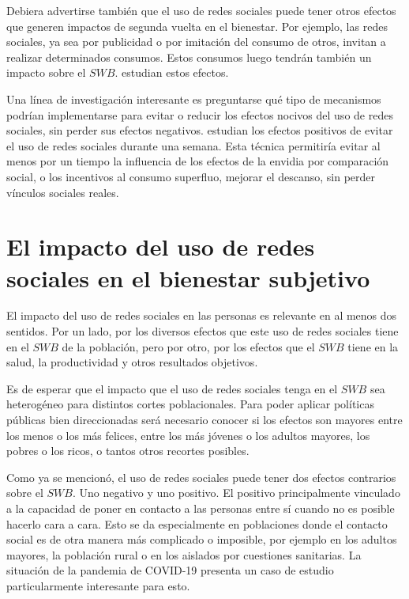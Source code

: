 \documentclass[11pt]{article}
\begin{document}
Debiera advertirse también que el uso de redes sociales puede tener otros efectos que generen impactos de segunda vuelta en el bienestar. Por ejemplo, las redes sociales, ya sea por publicidad o por imitación del consumo de otros, invitan a realizar determinados consumos. Estos consumos luego tendrán también un impacto sobre el $SWB$.  estudian estos efectos. 

Una línea de investigación interesante es preguntarse qué tipo de mecanismos podrían implementarse para evitar o reducir los efectos nocivos del uso de redes sociales, sin perder sus efectos negativos.  estudian los efectos positivos de evitar el uso de redes sociales durante una semana. Esta técnica permitiría evitar al menos por un tiempo la influencia de los efectos de la envidia por comparación social, o los incentivos al consumo superfluo, mejorar el descanso, sin perder vínculos sociales reales. 

\section{El impacto del uso de redes sociales en el bienestar subjetivo}
El impacto del uso de redes sociales en las personas es relevante en al menos dos sentidos. Por un lado, por los diversos efectos que este uso de redes sociales tiene en el $SWB$ de la población, pero por otro, por los efectos que el $SWB$ tiene en la salud, la productividad y otros resultados objetivos. 

Es de esperar que el impacto que el uso de redes sociales tenga en el $SWB$ sea heterogéneo para distintos cortes poblacionales. Para poder aplicar políticas públicas bien direccionadas será necesario conocer si los efectos son mayores entre los menos o los más felices, entre los más jóvenes o los adultos mayores, los pobres o los ricos, o tantos otros recortes posibles. 

Como ya se mencionó, el uso de redes sociales puede tener dos efectos contrarios sobre el $SWB$. Uno negativo y uno positivo. El positivo principalmente vinculado a la capacidad de poner en contacto a las personas entre sí cuando no es posible hacerlo cara a cara. Esto se da especialmente en poblaciones donde el contacto social es de otra manera más complicado o imposible, por ejemplo en los adultos mayores, la población rural o en los aislados por cuestiones sanitarias. La situación de la pandemia de COVID-19 presenta un caso de estudio particularmente interesante para esto. 
\end{document}
